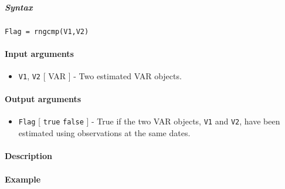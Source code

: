 


	\subparagraph{Syntax}\label{syntax}

\begin{verbatim}
Flag = rngcmp(V1,V2)
\end{verbatim}

\paragraph{Input arguments}\label{input-arguments}

\begin{itemize}
\itemsep1pt\parskip0pt
\item
  \texttt{V1}, \texttt{V2} {[} VAR {]} - Two estimated VAR objects.
\end{itemize}

\paragraph{Output arguments}\label{output-arguments}

\begin{itemize}
\itemsep1pt\parskip0pt
\item
  \texttt{Flag} {[} \texttt{true} \textbar{} \texttt{false} {]} - True
  if the two VAR objects, \texttt{V1} and \texttt{V2}, have been
  estimated using observations at the same dates.
\end{itemize}

\paragraph{Description}\label{description}

\paragraph{Example}\label{example}


